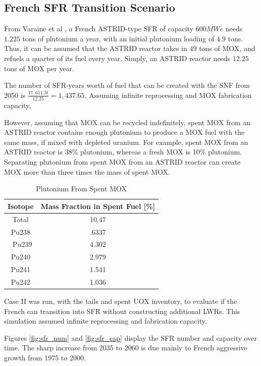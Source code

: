 \subsection{French \gls{SFR} Transition Scenario}

From Varaine et al \cite{varaine_pre-conceptual_2012}, a French
ASTRID-type \gls{SFR} of capacity $600 MWe$ needs $1.225$ tons of
plutonium a year, with an initial plutonium loading of $4.9$ tons.
Thus, it can be assumed that the ASTRID reactor takes in $49$ tons of 
\gls{MOX}, and refuels a quarter of its fuel every year. Simply,
an ASTRID reactor needs $12.25$ tons of \gls{MOX} per year. 

The number of SFR-years worth of fuel that can be created with
the \gls{SNF} from 2050 is $\frac{17,611.3 t}{12.25} = 1,437.65 $.
Assuming infinite reprocessing and \gls{MOX} fabrication capacity,

However, assuming that \gls{MOX} can be recycled indefinitely,
spent \gls{MOX} from an ASTRID reactor
contains enough plutonium to produce a \gls{MOX} fuel with
the same mass, if mixed with depleted uranium. For example,
spent \gls{MOX} from an ASTRID reactor is 38\% plutonium,
whereas a fresh \gls{MOX} is 10\% plutonium. Separating plutonium
from spent \gls{MOX} from an ASTRID reactor can create \gls{MOX} more than
three times the mass of spent \gls{MOX}.

\begin{table}[h]
	\centering
	\begin{tabular}{|c|c|}
		\hline
		Isotope & Mass Fraction in Spent Fuel [\%] \\ \hline
		Total & 10.47 \\ \hline
		Pu238 & .6337 \\ \
		Pu239 & 4.302 \\ \hline
		Pu240 & 2.979 \\ \hline
		Pu241 & 1.541 \\ \hline
		Pu242 & 1.036 \\ \hline
	\end{tabular}
	\caption{Plutonium From Spent \gls{MOX}}
	\label{tab:mox_waste}
\end{table}

Case II was run, with the tails and spent \gls{UOX}
inventory, to evaluate if the French can transition into \gls{SFR}
without constructing additional \gls{LWR}s. This simulation
assumed infinite reprocessing and fabrication capacity.

Figures \ref{fig:sfr_num} and \ref{fig:sfr_cap} display
the \gls{SFR} number and capacity over time.
The sharp increase from 2035 to 2060 is due mainly to
French aggressive growth from 1975 to 2000.


